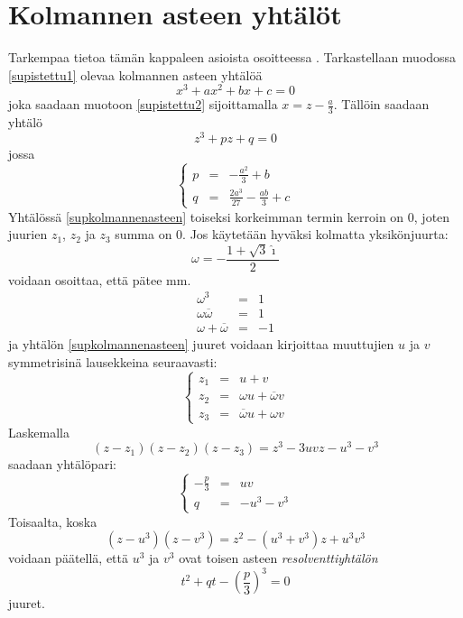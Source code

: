 \documentclass[a4paper]{article}
\begin{document}
\section{Kolmannen asteen yhtälöt}
Tarkempaa tietoa tämän kappaleen asioista osoitteessa \cite{Wei1}. Tarkastellaan muodossa \ref{supistettu1} olevaa kolmannen asteen yhtälöä
$$
x^3+ax^2+bx+c=0
$$
joka saadaan muotoon \ref{supistettu2} sijoittamalla $x=z-\frac{a}{3}$. Tällöin saadaan yhtälö
\begin{equation}
\label{supkolmannenasteen}
z^3+pz+q=0
\end{equation}
jossa
$$
\left\{
\begin{array}{ccc}
  p & = & -\frac{a^2}{3}+b \\
  q & = & \frac{2a^3}{27}-\frac{ab}{3}+c
\end{array}
\right.
$$
Yhtälössä \ref{supkolmannenasteen} toiseksi korkeimman termin kerroin on 0, joten juurien $z_1$, $z_2$ ja $z_3$ summa on 0. Jos käytetään hyväksi kolmatta yksikönjuurta:
$$
\omega=-\frac{1+\sqrt{3}\hat\imath}{2}
$$
voidaan osoittaa, että pätee mm.
\begin{eqnarray*}
  \omega^3 & = & 1 \\
  \omega\overline{\omega} & = & 1 \\
  \omega+\overline{\omega} & = & -1
\end{eqnarray*}
ja yhtälön \ref{supkolmannenasteen} juuret voidaan kirjoittaa muuttujien $u$ ja $v$ symmetrisinä lausekkeina seuraavasti:
\begin{equation}
  \label{kolmjuuret}
\left\{
\begin{array}{ccc}
  z_1 & = & u+v \\
  z_2 & = & \omega u+\overline{\omega} v \\
  z_3 & = & \overline{\omega} u+\omega v
\end{array}
\right.
\end{equation}
Laskemalla
$$
(z-z_1)(z-z_2)(z-z_3)=z^3-3uvz-u^3-v^3
$$
saadaan yhtälöpari:
$$
\left\{
\begin{array}{ccc}
  -\frac{p}{3} & = & uv \\
  q & = & -u^3-v^3
\end{array}
\right.
$$
Toisaalta, koska
$$
(z-u^3)(z-v^3)=z^2-(u^3+v^3)z+u^3 v^3
$$
voidaan päätellä, että $u^3$ ja $v^3$ ovat toisen asteen \emph{resolventtiyhtälön}
\begin{equation}
  \label{kolmresolventti}
t^2+qt-\left(\frac{p}{3}\right)^3=0
\end{equation}
juuret.
\end{document}
